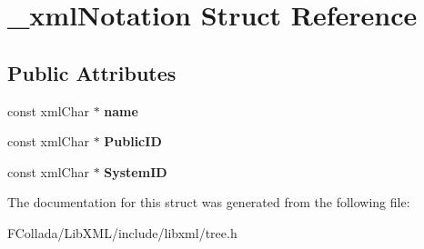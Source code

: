 \hypertarget{struct__xmlNotation}{
\section{\_\-xmlNotation Struct Reference}
\label{struct__xmlNotation}
}
\subsection*{Public Attributes}
\begin{DoxyCompactItemize}
\item 
\hypertarget{struct__xmlNotation_a15130985f4574a2cbb600c1d42461ee9}{
const xmlChar $\ast$ {\bfseries name}}
\label{struct__xmlNotation_a15130985f4574a2cbb600c1d42461ee9}

\item 
\hypertarget{struct__xmlNotation_a66aa8801ce658a57f9139599fc8fb80f}{
const xmlChar $\ast$ {\bfseries PublicID}}
\label{struct__xmlNotation_a66aa8801ce658a57f9139599fc8fb80f}

\item 
\hypertarget{struct__xmlNotation_a521da3fcb5b3f193a00a9782c1fe5ff7}{
const xmlChar $\ast$ {\bfseries SystemID}}
\label{struct__xmlNotation_a521da3fcb5b3f193a00a9782c1fe5ff7}

\end{DoxyCompactItemize}


The documentation for this struct was generated from the following file:\begin{DoxyCompactItemize}
\item 
FCollada/LibXML/include/libxml/tree.h\end{DoxyCompactItemize}
